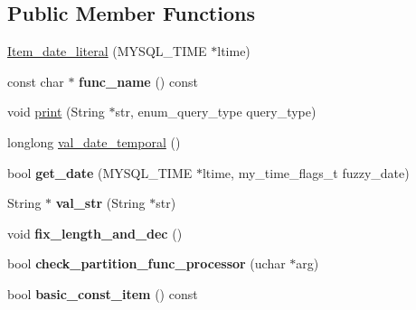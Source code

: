 \subsection*{Public Member Functions}
\begin{DoxyCompactItemize}
\item 
\mbox{\hyperlink{classItem__date__literal_a20fb73b64181defeecac08762bbf5959}{Item\+\_\+date\+\_\+literal}} (M\+Y\+S\+Q\+L\+\_\+\+T\+I\+ME $\ast$ltime)
\item 
\mbox{\label{classItem__date__literal_a426d2530b1aaa704dbfc335dd5998dcb}} 
const char $\ast$ {\bfseries func\+\_\+name} () const
\item 
void \mbox{\hyperlink{classItem__date__literal_af4a9546a669fb4f62178869b7e79f553}{print}} (String $\ast$str, enum\+\_\+query\+\_\+type query\+\_\+type)
\item 
longlong \mbox{\hyperlink{classItem__date__literal_a03ebcf3ba975b9b8605edad6e902b2db}{val\+\_\+date\+\_\+temporal}} ()
\item 
\mbox{\label{classItem__date__literal_ac58a8a80bf10402502ca32f2bd317ecc}} 
bool {\bfseries get\+\_\+date} (M\+Y\+S\+Q\+L\+\_\+\+T\+I\+ME $\ast$ltime, my\+\_\+time\+\_\+flags\+\_\+t fuzzy\+\_\+date)
\item 
\mbox{\label{classItem__date__literal_a742627ffa181df3893e7e8194b19b23a}} 
String $\ast$ {\bfseries val\+\_\+str} (String $\ast$str)
\item 
\mbox{\label{classItem__date__literal_aaf35816c14de1639c32383236313c5aa}} 
void {\bfseries fix\+\_\+length\+\_\+and\+\_\+dec} ()
\item 
\mbox{\label{classItem__date__literal_a1a3a7fe4cb583be8a5e5b2110bd4dd85}} 
bool {\bfseries check\+\_\+partition\+\_\+func\+\_\+processor} (uchar $\ast$arg)
\item 
\mbox{\label{classItem__date__literal_ad0b3d7596337b01843f1efb3cb6404ac}} 
bool {\bfseries basic\+\_\+const\+\_\+item} () const
\item 
\mbox{\label{classItem__date__literal_a2eb30356d8a8d53390d63899a1960981}} 

\end{DoxyCompactItemize}

